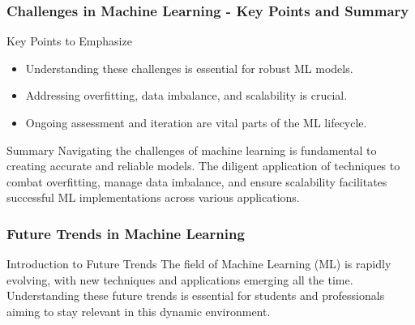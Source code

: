 \documentclass[aspectratio=169]{beamer}
\begin{document}
\begin{frame}[fragile]
    \frametitle{Challenges in Machine Learning - Key Points and Summary}
    \begin{block}{Key Points to Emphasize}
        \begin{itemize}
            \item Understanding these challenges is essential for robust ML models.
            \item Addressing overfitting, data imbalance, and scalability is crucial.
            \item Ongoing assessment and iteration are vital parts of the ML lifecycle.
        \end{itemize}
    \end{block}

    \begin{block}{Summary}
        Navigating the challenges of machine learning is fundamental to creating accurate and reliable models. The diligent application of techniques to combat overfitting, manage data imbalance, and ensure scalability facilitates successful ML implementations across various applications.
    \end{block}
\end{frame}

\begin{frame}[fragile]
    \frametitle{Future Trends in Machine Learning}
    \begin{block}{Introduction to Future Trends}
        The field of Machine Learning (ML) is rapidly evolving, with new techniques and applications emerging all the time. Understanding these future trends is essential for students and professionals aiming to stay relevant in this dynamic environment.
    \end{block}
\end{frame}
\end{document}
